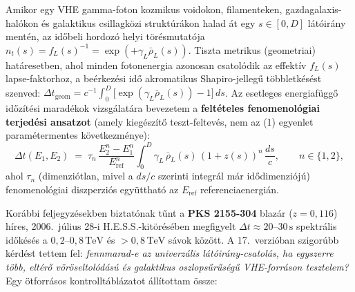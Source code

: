 \documentclass[10pt,a4paper]{article}
\begin{document}
\par
Amikor egy VHE gamma-foton kozmikus voidokon, filamenteken, gazdagalaxis-hal\'okon \'es galaktikus csillagk\"ozi strukt\'ur\'akon halad \'at egy $s \in [0, D]$ l\'at\'oir\'any ment\'en, az id\H{o}beli hordoz\'o helyi t\"or\'esmutat\'oja $n_t(s) = f_L(s)^{-1} = \exp(+\gamma_L \bar{\rho}_L(s))$. Tiszta metrikus (geometriai) hat\'aresetben, ahol minden fotonenergia azonosan csatol\'odik az effekt\'iv $f_L(s)$ lapse-faktorhoz, a be\'erkez\'esi id\H{o} akromatikus Shapiro-jelleg\H{u} t\"obbletk\'es\'est szenved: $\Delta t_{\text{geom}} = c^{-1}\int_0^D \bigl[\exp(\gamma_L\bar{\rho}_L(s)) - 1\bigr]\,ds$. Az esetleges energiaf\"ugg\H{o} id\H{o}z\'it\'esi marad\'ekok vizsg\'alat\'ara bevezetem a \textbf{felt\'eteles fenomenol\'ogiai terjed\'esi ansatzot} (amely kieg\'esz\'it\H{o} teszt-feltev\'es, nem az (1) egyenlet param\'etermentes k\"ovetkezm\'enye):
\begin{equation}
  \Delta t(E_1, E_2) \;=\; \tau_n\,\frac{E_2^n - E_1^n}{E_{\text{ref}}^n}\int_0^D \gamma_L\,\bar{\rho}_L(s)\,(1+z(s))^n\,\frac{ds}{c}, \qquad n \in \{1, 2\},
\end{equation}
ahol $\tau_n$ (dimenzi\'otlan, mivel a $ds/c$ szerinti integr\'al m\'ar id\H{o}dimenzi\'oj\'u) fenomenol\'ogiai diszperzi\'os egy\"utthat\'o az $E_{\text{ref}}$ referenciaenergi\'an.

\par
Kor\'abbi feljegyz\'esekben biztat\'onak t\H{u}nt a \textbf{PKS 2155-304} blaz\'ar ($z = 0{,}116$) h\'ires, 2006.\ j\'ulius 28-i H.E.S.S.-kit\"or\'es\'eben megfigyelt $\Delta t \approx 20\text{--}30\,\text{s}$ spektr\'alis id\H{o}k\'es\'es a $0{,}2\text{--}0{,}8\,\text{TeV}$ \'es $>0{,}8\,\text{TeV}$ s\'avok k\"oz\"ott. A 17.\ verzi\'oban szigor\'ubb k\'erd\'est tettem fel: \emph{fennmarad-e az univerz\'alis l\'at\'oir\'any-csatol\'as, ha egyszerre t\"obb, elt\'er\H{o} v\"or\"oseltol\'od\'as\'u \'es galaktikus oszlops\H{u}r\H{u}s\'eg\H{u} VHE-forr\'ason tesztelem?} Egy \"otforr\'asos kontrollt\'abl\'azatot \'all\'itottam \"ossze:
\end{document}
